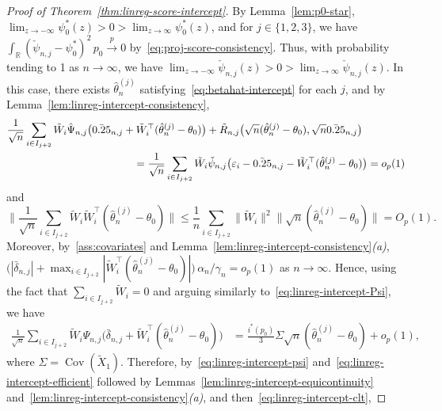 \documentclass[a4paper]{article}
\newcommand{\R}{\mathbb{R}}
\newcommand{\norm}[1]{\|{#1}\|}
\newcommand{\cvp}{\overset{p}{\to}}
\DeclareMathOperator\Cov{Cov}
\theoremstyle{definition}
\begin{document}
\begin{proof}[Proof of Theorem~\ref{thm:linreg-score-intercept}]
By Lemma~\ref{lem:p0-star}, $\lim_{z \to -\infty}\psi_0^*(z) > 0 > \lim_{z \to \infty}\psi_0^*(z)$, and for $j \in \{1,2,3\}$, we have $\int_\R (\check{\psi}_{n,j} - \psi_0^*)^2\,p_0 \cvp 0$ by~\eqref{eq:proj-score-consistency}. Thus, with probability tending to 1 as $n \to \infty$, we have $\lim_{z \to -\infty}\check{\psi}_{n,j}(z) > 0 > \lim_{z \to \infty}\check{\psi}_{n,j}(z)$. In this case, there exists $\hat{\theta}_n^{(j)}$ satisfying~\eqref{eq:betahat-intercept} for each $j$, and by Lemma~\ref{lem:linreg-intercept-consistency},
\begin{align}
\frac{1}{\sqrt{n}}\sum_{i \in I_{j+2}} \tilde{W}_i\hat{\Psi}_{n,j}\bigl(\bar{\delta}_{n,j} &+ \tilde{W}_i^\top(\hat{\theta}_n^{(j)} - \theta_0)\bigr) + \tilde{R}_{n,j}\bigl(\sqrt{n}(\hat{\theta}_n^{(j)} - \theta_0), \sqrt{n}\bar{\delta}_{n,j}\bigr) \notag \\
\label{eq:linreg-intercept-efficient}
&\quad= \frac{1}{\sqrt{n}}\sum_{i \in I_{j+2}} \tilde{W}_i\check{\psi}_{n,j}\bigl(\varepsilon_i - \bar{\delta}_{n,j} - \tilde{W}_i^\top(\hat{\theta}_n^{(j)} - \theta_0)\bigr) = o_p(1)
\end{align}
and
\[
\biggl\|\frac{1}{\sqrt{n}}\sum_{i \in I_{j+2}} \tilde{W}_i \tilde{W}_i^\top(\hat{\theta}_n^{(j)} - \theta_0)\biggr\|
\leq \frac{1}{n}\sum_{i \in I_{j+2}} \norm{\tilde{W}_i}^2 \norm{\sqrt{n}(\hat{\theta}_n^{(j)} - \theta_0)} = O_p(1).
\]
Moreover, by~\ref{ass:covariates} and Lemma~\ref{lem:linreg-intercept-consistency}\textit{(a)}, $\bigl(|\bar{\delta}_{n,j}| + \max_{i \in I_{j+2}}|\tilde{W}_i^\top (\hat{\theta}_n^{(j)} - \theta_0)|\bigr)\,\alpha_n/\gamma_n = o_p(1)$ as $n \to \infty$. Hence, using the fact that $\sum_{i \in I_{j+2}}\tilde{W}_i = 0$ and arguing similarly to~\eqref{eq:linreg-intercept-Psi}, we have
\begin{align}
\label{eq:linreg-intercept-psi}
\frac{1}{\sqrt{n}}\sum_{i \in I_{j+2}} \tilde{W}_i\hat{\Psi}_{n,j}\bigl(\bar{\delta}_{n,j} + \tilde{W}_i^\top(\hat{\theta}_n^{(j)} - \theta_0)\bigr)
&= \frac{i^*(p_0)}{3}\Sigma\sqrt{n}(\hat{\theta}_n^{(j)} - \theta_0) + o_p(1),
\end{align}
where $\Sigma = \Cov(\tilde{X}_1)$. Therefore, by~\eqref{eq:linreg-intercept-psi} and~\eqref{eq:linreg-intercept-efficient} followed by Lemmas~\ref{lem:linreg-intercept-equicontinuity} and~\ref{lem:linreg-intercept-consistency}\textit{(a)}, and then~\eqref{eq:linreg-intercept-clt},

\end{proof}
\end{document}
